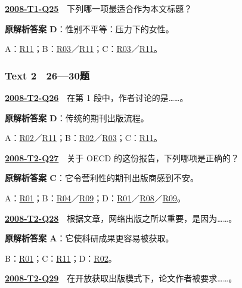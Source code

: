 \documentclass[11pt,a4paper]{article}
\begin{document}
\label{idx-2008-T1-Q25}\noindent\textbf{\href{https://zj139.github.io/math-notes/english/c0860baac11c5ef23be4bfac/\#q25}{2008-T1-Q25}}　下列哪一项最适合作为本文标题？\par\nopagebreak
\noindent\textbf{原解析答案 D}：性别不平等：压力下的女性。\par\nopagebreak
\noindent A：\hyperref[cat-R11]{R11}；B：\hyperref[cat-R03]{R03}／\hyperref[cat-R11]{R11}；C：\hyperref[cat-R03]{R03}／\hyperref[cat-R11]{R11}。\par\smallskip
{}\subsubsection{Text 2　26—30题}
\label{idx-2008-T2-Q26}\noindent\textbf{\href{https://zj139.github.io/math-notes/english/218b3a79bc4e7687dd26be0c/\#q26}{2008-T2-Q26}}　在第 1 段中，作者讨论的是……。\par\nopagebreak
\noindent\textbf{原解析答案 D}：传统的期刊出版流程。\par\nopagebreak
\noindent A：\hyperref[cat-R02]{R02}／\hyperref[cat-R11]{R11}；B：\hyperref[cat-R02]{R02}／\hyperref[cat-R03]{R03}；C：\hyperref[cat-R11]{R11}。\par\smallskip
{}\label{idx-2008-T2-Q27}\noindent\textbf{\href{https://zj139.github.io/math-notes/english/218b3a79bc4e7687dd26be0c/\#q27}{2008-T2-Q27}}　关于 OECD 的这份报告，下列哪项是正确的？\par\nopagebreak
\noindent\textbf{原解析答案 C}：它令营利性的期刊出版商感到不安。\par\nopagebreak
\noindent A：\hyperref[cat-R01]{R01}；B：\hyperref[cat-R04]{R04}／\hyperref[cat-R09]{R09}；D：\hyperref[cat-R01]{R01}／\hyperref[cat-R08]{R08}／\hyperref[cat-R09]{R09}。\par\smallskip
{}\label{idx-2008-T2-Q28}\noindent\textbf{\href{https://zj139.github.io/math-notes/english/218b3a79bc4e7687dd26be0c/\#q28}{2008-T2-Q28}}　根据文章，网络出版之所以重要，是因为……。\par\nopagebreak
\noindent\textbf{原解析答案 A}：它使科研成果更容易被获取。\par\nopagebreak
\noindent B：\hyperref[cat-R01]{R01}；C：\hyperref[cat-R11]{R11}；D：\hyperref[cat-R02]{R02}。\par\smallskip
{}\label{idx-2008-T2-Q29}\noindent\textbf{\href{https://zj139.github.io/math-notes/english/218b3a79bc4e7687dd26be0c/\#q29}{2008-T2-Q29}}　在开放获取出版模式下，论文作者被要求……。\par\nopagebreak
\end{document}
